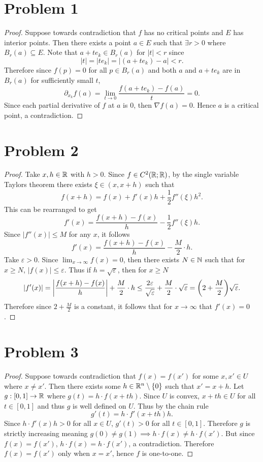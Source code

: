 \documentclass{eeleyes}
\newcommand\eps{\varepsilon}
\begin{document}
\section*{Problem 1}
\begin{proof}
    Suppose towards contradiction that $f$ has no critical points and $E$ has interior points. Then there exists a point $a \in E$ such that $\exists r > 0$ where $B_r(a) \subseteq E$. Note that $a + t e_k \in B_r(a)$ for $|t| < r$ since
    \[
        |t| = |te_k| = |(a + te_k) - a| < r
    .\]
    Therefore since $f(p) = 0$ for all $p \in B_r(a)$ and both $a$ and $a + t e_k$ are in $B_r(a)$ for sufficiently small $t$,
    \[
        \partial_{x_k} f(a) = \lim_{t \to 0} \frac{f(a+t e_k) - f(a)}{t} = 0
    .\]
    Since each partial derivative of $f$ at $a$ is $0$, then $\nabla f (a) = 0$. Hence $a$ is a critical point, a contradiction.
\end{proof}

\section*{Problem 2}
\begin{proof}
    Take $x, h \in \mathbb{R}$ with $h > 0$. Since $f \in C^2(\mathbb{R}; \mathbb{R})$, by the single variable Taylors theorem there exists $\xi \in (x, x + h)$ such that
    \[
        f(x + h) = f(x) + f'(x)h + \frac{1}{2} f''(\xi) h^2
    .\]
    This can be rearranged to get
    \[
        f'(x) = \frac{f(x+h) - f(x)}{h} - \frac{1}{2} f''(\xi) h
    .\]
    Since $|f''(x)| \leq M$ for any $x$, it follows
    \[
        f'(x) = \frac{f(x + h) - f(x)}{h} - \frac{M}{2} \cdot h
    .\]
    Take $\eps > 0$. Since $\lim_{x \to \infty} f(x) = 0$, then there exists $N \in \mathbb{N}$ such that for $x \geq N$, $|f(x)| \leq \eps$. Thus if $h = \sqrt{\eps}$, then for $x \geq N$
    \[
        |f'(x)| = \qty|\frac{f(x+h) - f(x)}{h}| + \frac{M}{2} \cdot h \leq \frac{2\eps}{\sqrt{\eps}} + \frac{M}{2} \cdot \sqrt{\eps} = \qty(2 + \frac{M}{2}) \sqrt{\eps}
    .\]
    Therefore since $2 + \frac{M}{2}$ is a constant, it follows that for $x \to \infty$ that $f'(x) = 0$.
\end{proof}

\section*{Problem 3}
\begin{proof}
    Suppose towards contradiction that $f(x) = f(x')$ for some $x, x' \in U$ where $x \neq x'$. Then there exists some $h \in \mathbb{R}^n \setminus\qty{0}$ such that $x' = x + h$. Let $g : [0,1] \to \mathbb{R}$ where $g(t) = h \cdot f(x + th)$. Since $U$ is convex, $x + th \in U$ for all $t \in [0,1]$ and thus $g$ is well defined on $U$. Thus by the chain rule
    \[
        g'(t) = h \cdot f'(x + th) h
    .\]
    Since $h \cdot f'(x) h > 0$ for all $x \in U$, $g'(t) > 0$ for all $t \in [0,1]$. Therefore $g$ is strictly increasing meaning $g(0) \neq g(1) \implies h \cdot f(x) \neq h \cdot f(x')$. But since $f(x) = f(x')$, $h \cdot f(x) = h \cdot f(x')$, a contradiction. Therefore $f(x) = f(x')$ only when $x = x'$, hence $f$ is one-to-one.
\end{proof}
\end{document}
